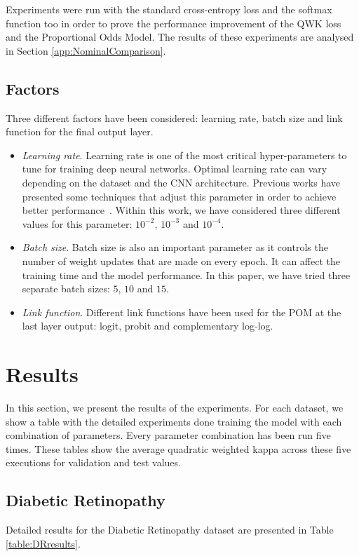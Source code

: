 \documentclass[journal]{IEEEtran}
\begin{document}
	Experiments were run with the standard cross-entropy loss and the softmax function too in order to prove the performance improvement of the QWK loss and the Proportional Odds Model. The results of these experiments are analysed in Section \ref{app:NominalComparison}.
	
	\subsection{Factors}
	Three different factors have been considered: learning rate, batch size and link function for the final output layer.
	
	\begin{itemize}
		\item \textit{Learning rate}. Learning rate is one of the most critical hyper-parameters to tune for training deep neural networks. Optimal learning rate can vary depending on the dataset and the CNN architecture. Previous works have presented some techniques that adjust this parameter in order to achieve better performance~\cite{smith2017cyclical, senior2013empirical}. Within this work, we have considered three different values for this parameter: $10^{-2}$, $10^{-3}$ and $10^{-4}$.
		\item \textit{Batch size}. Batch size is also an important parameter as it controls the number of weight updates that are made on every epoch. It can affect the training time and the model performance. In this paper, we have tried three separate batch sizes: $5$, $10$ and $15$.
		\item \textit{Link function}. Different link functions have been used for the POM at the last layer output: logit, probit and complementary log-log.
	\end{itemize}
	
	\section{Results}
	\label{sect:results}
	In this section, we present the results of the experiments. For each dataset, we show a table with the detailed experiments done training the model with each combination of parameters. Every parameter combination has been run five times. These tables show the average quadratic weighted kappa across these five executions for validation and test values.
	
	\subsection{Diabetic Retinopathy}
	\label{sect:dr}
	Detailed results for the Diabetic Retinopathy dataset are presented in Table \ref{table:DRresults}.
	
\end{document}
